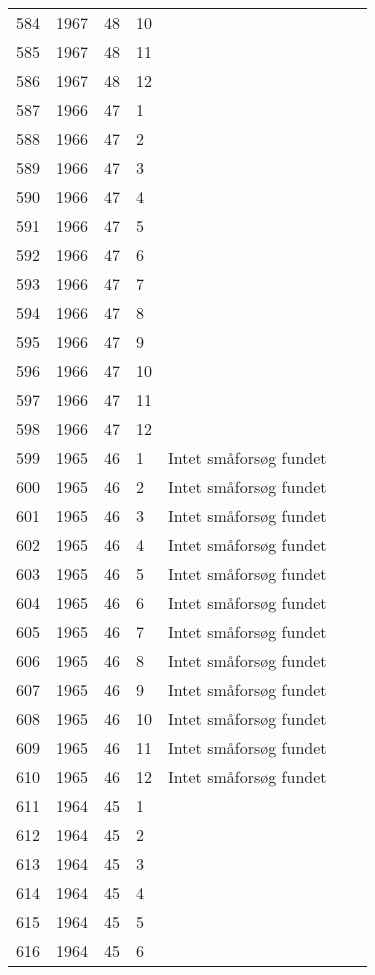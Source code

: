 \begin{longtable}{ |l|l|l|l|l|l|l| }
584 & 1967 & 48 & 10 &  &  &  \\
585 & 1967 & 48 & 11 &  &  &  \\
586 & 1967 & 48 & 12 &  &  &  \\
587 & 1966 & 47 & 1 &  &  &  \\
588 & 1966 & 47 & 2 &  &  &  \\
589 & 1966 & 47 & 3 &  &  &  \\
590 & 1966 & 47 & 4 &  &  &  \\
591 & 1966 & 47 & 5 &  &  &  \\
592 & 1966 & 47 & 6 &  &  &  \\
593 & 1966 & 47 & 7 &  &  &  \\
594 & 1966 & 47 & 8 &  &  &  \\
595 & 1966 & 47 & 9 &  &  &  \\
596 & 1966 & 47 & 10 &  &  &  \\
597 & 1966 & 47 & 11 &  &  &  \\
598 & 1966 & 47 & 12 &  &  &  \\
599 & 1965 & 46 & 1 & Intet småforsøg fundet &  &  \\
600 & 1965 & 46 & 2 & Intet småforsøg fundet &  &  \\
601 & 1965 & 46 & 3 & Intet småforsøg fundet &  &  \\
602 & 1965 & 46 & 4 & Intet småforsøg fundet &  &  \\
603 & 1965 & 46 & 5 & Intet småforsøg fundet &  &  \\
604 & 1965 & 46 & 6 & Intet småforsøg fundet &  &  \\
605 & 1965 & 46 & 7 & Intet småforsøg fundet &  &  \\
606 & 1965 & 46 & 8 & Intet småforsøg fundet &  &  \\
607 & 1965 & 46 & 9 & Intet småforsøg fundet &  &  \\
608 & 1965 & 46 & 10 & Intet småforsøg fundet &  &  \\
609 & 1965 & 46 & 11 & Intet småforsøg fundet &  &  \\
610 & 1965 & 46 & 12 & Intet småforsøg fundet &  &  \\
611 & 1964 & 45 & 1 &  &  &  \\
612 & 1964 & 45 & 2 &  &  &  \\
613 & 1964 & 45 & 3 &  &  &  \\
614 & 1964 & 45 & 4 &  &  &  \\
615 & 1964 & 45 & 5 &  &  &  \\
616 & 1964 & 45 & 6 &  &  &  \\

\end{longtable}
